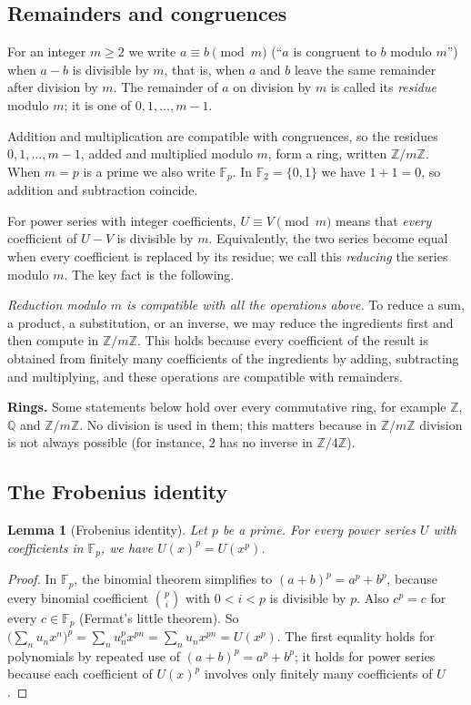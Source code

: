 \documentclass[11pt,a4paper]{article}
\newtheorem{lemma}[theorem]{Lemma}
\theoremstyle{definition}
\theoremstyle{remark}
\newcommand{\Z}{\mathbb{Z}}
\newcommand{\Q}{\mathbb{Q}}
\newcommand{\F}{\mathbb{F}}
\newcommand{\para}[1]{\par\medskip\noindent\textbf{#1}\enspace}
\begin{document}
\subsection{Remainders and congruences}
For an integer $m\ge2$ we write $a\equiv b\pmod m$ (``$a$ is congruent to $b$ modulo $m$'') when $a-b$ is divisible by
$m$, that is, when $a$ and $b$ leave the same remainder after division by $m$. The remainder of $a$ on division by
$m$ is called its \emph{residue} modulo $m$; it is one of $0,1,\dots,m-1$.

Addition and multiplication are compatible with congruences, so the residues $0,1,\dots,m-1$, added and multiplied
modulo $m$, form a ring, written $\Z/m\Z$. When $m=p$ is a prime we also write $\F_p$. In $\F_2=\{0,1\}$ we have $1+1=0$,
so addition and subtraction coincide.

For power series with integer coefficients, $U\equiv V\pmod m$ means that \emph{every} coefficient of $U-V$ is
divisible by $m$. Equivalently, the two series become equal when every coefficient is replaced by its residue; we call
this \emph{reducing} the series modulo $m$. The key fact is the following.

\emph{Reduction modulo $m$ is compatible with all the operations above.} To reduce a sum, a product, a substitution, or
an inverse, we may reduce the ingredients first and then compute in $\Z/m\Z$. This holds because every
coefficient of the result is obtained from finitely many coefficients of the ingredients by adding, subtracting and
multiplying, and these operations are compatible with remainders.

\para{Rings.} Some statements below hold over every commutative ring, for example $\Z$, $\Q$ and $\Z/m\Z$. No
division is used in them; this matters because in $\Z/m\Z$ division is not always possible (for instance, $2$ has no inverse in
$\Z/4\Z$).

\subsection{The Frobenius identity}
\begin{lemma}[Frobenius identity]\label{lem:frobenius}
Let $p$ be a prime. For every power series $U$ with coefficients in $\F_p$, we have $U(x)^p=U(x^p)$.
\end{lemma}

\begin{proof}
In $\F_p$, the binomial theorem simplifies to $(a+b)^p=a^p+b^p$, because every binomial coefficient
$\binom pi$ with $0<i<p$ is divisible by $p$. Also $c^p=c$ for every $c\in\F_p$ (Fermat's little theorem). So
$\bigl(\sum_nu_nx^n\bigr)^p=\sum_nu_n^px^{pn}=\sum_nu_nx^{pn}=U(x^p)$. The first equality holds for polynomials by
repeated use of $(a+b)^p=a^p+b^p$; it holds for power series because each coefficient of $U(x)^p$ involves only finitely
many coefficients of $U$.
\end{proof}
\end{document}

